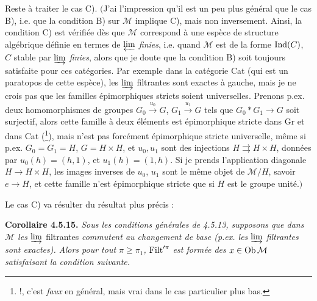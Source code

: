 Reste à traiter le cas C). $\Big($J'ai l'impression qu'il est un peu plus général que le cas B), i.e. que la condition B) sur $\mathcal{M}$ implique C), mais non inversement. Ainsi, la condition C) est vérifiée dès que $\mathcal{M}$ correspond à une espèce de structure algébrique définie en
termes de $\varprojlim$ \textit{finies}, i.e. quand $\mathcal{M}$ est de la forme $\operatorname{Ind}(C)$, $C$ stable par $\varinjlim$ \textit{finies}, alors que je doute que la condition B) soit toujours satisfaite pour ces catégories. Par exemple dans la catégorie Cat (qui est un paratopos de cette espèce), les $\varinjlim$ filtrantes sont exactes à gauche, mais je ne crois pas que les familles épimorphiques stricts soient universelles. %
Prenons p.ex. deux homomorphismes de groupes $G_0 \xrightarrow{u_0} G$, $G_1 \xrightarrow{u_1} G$ tels que $G_0 * G_1 \longrightarrow G$ soit surjectif, alors cette famille à deux éléments est épimorphique stricte dans Gr et dans Cat (\footnote{!, c'est \textit{faux} en général, mais vrai dans le cas particulier plus bas.}), mais n'est pas forcément épimorphique stricte universelle, même si p.ex. $G_0 = G_1 = H$, $G = H \times H$, et $u_0, u_1$ sont des injections $H \rightrightarrows H \times H$, données par $u_0(h) = (h,1)$, et $u_1(h) = (1,h)$. Si je prends l'application diagonale $H \longrightarrow H \times H$, les images inverses de $u_0$, $u_1$ sont le même objet de $\mathcal{M}/H$, savoir $e \longrightarrow H$, et cette famille n'est épimorphique stricte que si $H$ est le groupe unité.$\Big)$

Le cas C) va résulter du résultat plus précis :

\textbf{Corollaire 4.5.15.} \textit{Sous les conditions générales de 4.5.13, supposons que dans $\mathcal{M}$ les} $\varinjlim$
filtrantes \textit{commutent au changement de base (p.ex. les} $\varinjlim$ \textit{filtrantes sont exactes). Alors pour tout $\pi \geqslant \pi_1$,} $\operatorname{Filt}'^{\pi}$ \textit{est formée des $x \in \mathrm{Ob}\, \mathcal{M}$ satisfaisant la condition suivante.}

